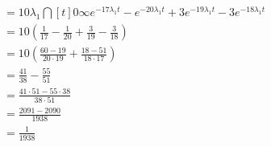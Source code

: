 \begin{enumerate}[(1)]
\begin{align*}
            &= 10\lambda_1 \dint[t]{0}{\infty}{e^{-17\lambda_1 t} - e^{-20\lambda_1 t} + 3e^{-19\lambda_1 t} - 3e^{-18\lambda_1 t}}\\
            &= 10\left(\frac{1}{17} - \frac{1}{20} + \frac{3}{19} - \frac{3}{18}\right)\\
            &= 10\left(\frac{60 - 19}{20\cdot 19} + \frac{18 - 51}{18\cdot 17}\right)\\
            &= \frac{41}{38} - \frac{55}{51}\\
            &= \frac{41\cdot 51 - 55\cdot 38}{38 \cdot 51}\\
            &= \frac{2091 - 2090}{1938}\\
            &= \frac{1}{1938}\\
        \end{align*}
\end{enumerate}